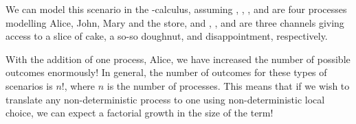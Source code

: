 We can model this scenario in the \textpi-calculus, assuming \alice, \john,
\mary, and \store are four processes modelling Alice, John, Mary and the store,
and \sliceofcake, \doughnut, and \nope are three channels giving access to a
slice of cake, a so-so doughnut, and disappointment, respectively.
\begin{center}
\end{center}
With the addition of one process, Alice, we have increased the number of possible
outcomes enormously! In general, the number of outcomes for these types of
scenarios is $n!$, where $n$ is the number of processes. This means that if we
wish to translate any non-deterministic process to one using non-deterministic
local choice, we can expect a factorial growth in the size of the term!
